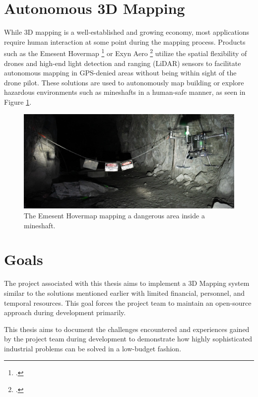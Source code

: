\section{Autonomous 3D Mapping}
While 3D mapping is a well-established and growing economy, most applications require human interaction at some point during the mapping process. Products such as the Emesent Hovermap \footcite{hovermap2021} or Exyn Aero \footcite{exynAero2021} utilize the spatial flexibility of drones and high-end light detection and ranging (LiDAR) sensors to facilitate autonomous mapping in GPS-denied areas without being within sight of the drone pilot. These solutions are used to autonomously map building or explore hazardous environments such as mineshafts in a human-safe manner, as seen in Figure \ref{fig:hovermap}.

\begin{figure}
	\centering
	\includegraphics[width=0.9\linewidth]{img/hovermap}
	\caption{
		The Emesent Hovermap mapping a dangerous area inside a mineshaft.\protect\footnotemark
	}
	\label{fig:hovermap}
\end{figure}

\section{Goals}
The project associated with this thesis aims to implement a 3D Mapping system similar to the solutions mentioned earlier with limited financial, personnel, and temporal resources. This goal forces the project team to maintain an open-source approach during development primarily.

This thesis aims to document the challenges encountered and experiences gained by the project team during development to demonstrate how highly sophisticated industrial problems can be solved in a low-budget fashion. 


